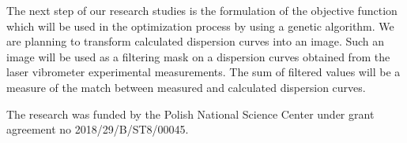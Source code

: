 \documentclass[]{spie}  %
\begin{document}
 The next step of our research studies is the formulation of the objective function which will be used in the optimization process by using a genetic algorithm. 
 We are planning to transform calculated dispersion curves into an image.
 Such an image will be used as a filtering mask on a dispersion curves obtained from the laser vibrometer experimental measurements.
 The sum of filtered values will be a measure of the match between measured and calculated dispersion curves.
 
\appendix    %


\acknowledgments %
 
The research was funded by the Polish National Science Center under grant agreement 
no 2018/29/B/ST8/00045. 

\end{document}
